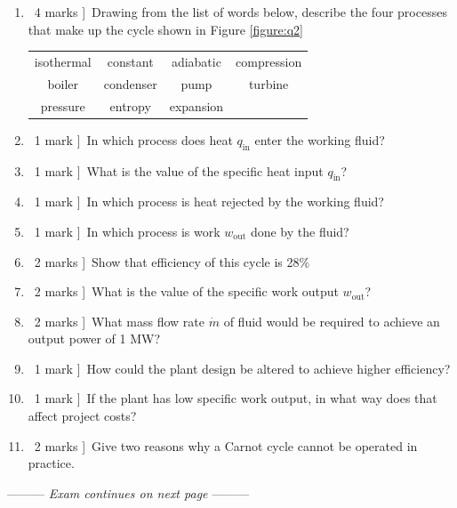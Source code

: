\documentclass[a4paper,12pt,fleqn]{article}
\newcommand{\middlewords}{Exam continues on next page}
\begin{document}
\begin{enumerate}[label=\alph*)]
\item \lbrack\ 4 marks ]\ Drawing from the list of words below, describe the four processes that make up the cycle shown in Figure \ref{figure:q2}\par
\begin{table}[h]
\centering
\begin{tabular}{c c c c}
isothermal & constant & adiabatic & compression\\
boiler & condenser & pump & turbine \\
pressure & entropy & expansion&\\
\end{tabular}
\end{table}
\item \lbrack\ 1 mark ]\ In which process does heat $q_\mathrm{in}$ enter the working fluid?
\item \lbrack\ 1 mark ]\ What is the value of the specific heat input $q_\mathrm{in}$?
\item \lbrack\ 1 mark ]\ In which process is heat rejected by the working fluid?
\item \lbrack\ 1 mark ]\ In which process is work $w_\mathrm{out}$ done by the fluid?
\item \lbrack\ 2 marks ]\ Show that efficiency of this cycle is 28\%
\item \lbrack\ 2 marks ]\ What is the value of the specific work output $w_\mathrm{out}$?
\item \lbrack\ 2 marks ]\ What mass flow rate $\dot m$ of fluid would be required to achieve an output power of 1 MW?
\item \lbrack\ 1 mark ]\ How could the plant design be altered to achieve higher efficiency?
\item \lbrack\ 1 mark ]\ If the plant has low specific work output, in what way does that affect project costs?
\item \lbrack\ 2 marks ]\ Give two reasons why a Carnot cycle cannot be operated in practice.
\end{enumerate}

\begin{center}
\vspace{3cm}
--------- \textit{\middlewords} ---------
\end{center}
\newpage
\end{document}
